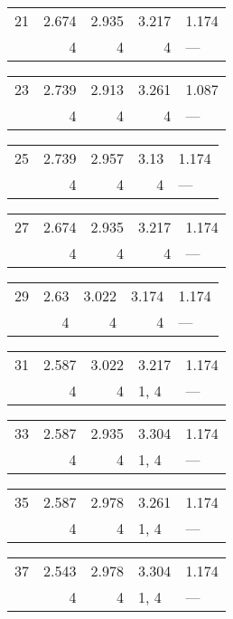 \begin{tabular}{lrrrl}
\toprule
 21 & 2.674 & 2.935 & 3.217 & 1.174 \\
    & 4     & 4     & 4     & ---   \\
\bottomrule
\end{tabular}
\begin{tabular}{lrrrl}
\toprule
 23 & 2.739 & 2.913 & 3.261 & 1.087 \\
    & 4     & 4     & 4     & ---   \\
\bottomrule
\end{tabular}
\begin{tabular}{lrrrl}
\toprule
 25 & 2.739 & 2.957 & 3.13 & 1.174 \\
    & 4     & 4     & 4    & ---   \\
\bottomrule
\end{tabular}
\begin{tabular}{lrrrl}
\toprule
 27 & 2.674 & 2.935 & 3.217 & 1.174 \\
    & 4     & 4     & 4     & ---   \\
\bottomrule
\end{tabular}
\begin{tabular}{lrrrl}
\toprule
 29 & 2.63 & 3.022 & 3.174 & 1.174 \\
    & 4    & 4     & 4     & ---   \\
\bottomrule
\end{tabular}
\begin{tabular}{lrrll}
\toprule
 31 & 2.587 & 3.022 & 3.217 & 1.174 \\
    & 4     & 4     & 1, 4  & ---   \\
\bottomrule
\end{tabular}
\begin{tabular}{lrrll}
\toprule
 33 & 2.587 & 2.935 & 3.304 & 1.174 \\
    & 4     & 4     & 1, 4  & ---   \\
\bottomrule
\end{tabular}
\begin{tabular}{lrrll}
\toprule
 35 & 2.587 & 2.978 & 3.261 & 1.174 \\
    & 4     & 4     & 1, 4  & ---   \\
\bottomrule
\end{tabular}
\begin{tabular}{lrrll}
\toprule
 37 & 2.543 & 2.978 & 3.304 & 1.174 \\
    & 4     & 4     & 1, 4  & ---   \\
\bottomrule
\end{tabular}
